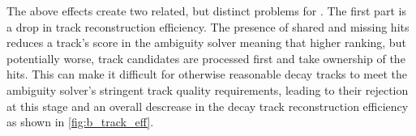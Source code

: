 The above effects create two related, but distinct problems for \btagging.
The first part is a drop in track reconstruction efficiency.
The presence of shared and missing hits reduces a track's score in the ambiguity solver meaning that higher ranking, but potentially worse, track candidates are processed first and take ownership of the hits.
This can make it difficult for otherwise reasonable \bhadron decay tracks to meet the ambiguity solver's stringent track quality requirements, leading to their rejection at this stage and an overall descrease in the \bhadron decay track reconstruction efficiency as shown in \cref{fig:b_track_eff}.

